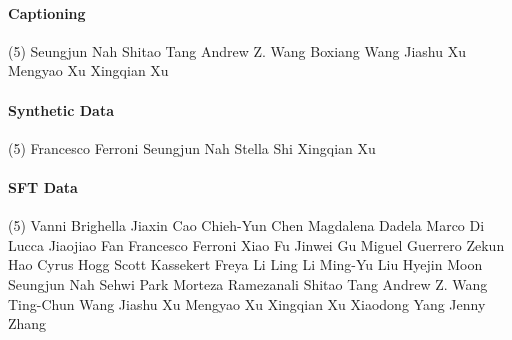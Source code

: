 \vspace{-0.32\baselineskip}\paragraph{\footnotesize Captioning} \mbox{}
\vspace{-0.32\baselineskip}
\begingroup
\footnotesize
\begin{tasks}[label=\relax, label-width=0pt, item-indent=4pt](5)
\task Seungjun Nah
\task Shitao Tang
\task Andrew Z. Wang
\task Boxiang Wang
\task Jiashu Xu
\task Mengyao Xu
\task Xingqian Xu
\end{tasks}
\endgroup

\vspace{-0.32\baselineskip}\paragraph{\footnotesize Synthetic Data} \mbox{}
\vspace{-0.32\baselineskip}
\begingroup
\footnotesize
\begin{tasks}[label=\relax, label-width=0pt, item-indent=4pt](5)
\task Francesco Ferroni
\task Seungjun Nah
\task Stella Shi
\task Xingqian Xu
\end{tasks}
\endgroup

\vspace{-0.32\baselineskip}\paragraph{\footnotesize SFT Data} \mbox{}
\vspace{-0.32\baselineskip}
\begingroup
\footnotesize
\begin{tasks}[label=\relax, label-width=0pt, item-indent=4pt](5)
\task Vanni Brighella 
\task Jiaxin Cao 
\task Chieh-Yun Chen 
\task Magdalena Dadela 
\task Marco Di Lucca 
\task Jiaojiao Fan 
\task Francesco Ferroni 
\task Xiao Fu 
\task Jinwei Gu 
\task Miguel Guerrero 
\task Zekun Hao 
\task Cyrus Hogg 
\task Scott Kassekert 
\task Freya Li 
\task Ling Li 
\task Ming-Yu Liu 
\task Hyejin Moon 
\task Seungjun Nah 
\task Sehwi Park 
\task Morteza Ramezanali 
\task Shitao Tang 
\task Andrew Z. Wang 
\task Ting-Chun Wang 
\task Jiashu Xu 
\task Mengyao Xu 
\task Xingqian Xu 
\task Xiaodong Yang 
\task Jenny Zhang 
\end{tasks}
\endgroup

